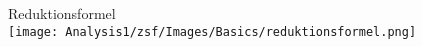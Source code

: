 \begin{corollary}{Reduktionsformel}\\
    \texttt{[image: Analysis1/zsf/Images/Basics/reduktionsformel.png]}
\end{corollary}
